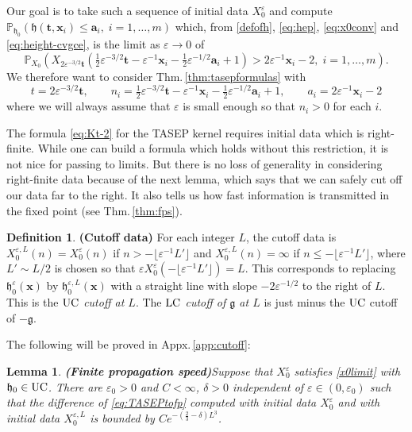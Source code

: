 \documentclass[letterpaper,reqno,11pt,oneside,final]{amsart}
\newtheorem{lem}[thm]{Lemma}
\theoremstyle{definition}
\newtheorem{defn}[thm]{Definition}
\newcommand{\fh}{\mathfrak{h}}
\newcommand{\fg}{\mathfrak{g}}
\newcommand{\xx}{X}
\newcommand{\pp}{\mathbb{P}}
\newcommand{\ep}{\varepsilon}
\newcommand{\uptext}[1]{\text{\upshape{#1}}}
\DeclareMathOperator{\UC}{\uptext{UC}}
\DeclareMathOperator{\LC}{\uptext{LC}}
\newcommand{\ft}{\mathbf{t}}
\newcommand{\fx}{\mathbf{x}}
\newcommand{\fa}{\mathbf{a}}
\numberwithin{equation}{section}
\begin{document}
Our goal is to take such a sequence of initial data $\xx^\ep_0$ and compute $\pp_{\fh_0} \!\left(\fh(\ft,\fx_i)\leq \fa_i,\;i=1,\dotsc,m\right)$ which, from \eqref{defofh}, \eqref{eq:hep}, \eqref{eq:x0conv} and \eqref{eq:height-cvgce}, is the limit as $\ep\to 0$ of
\begin{equation}\label{eq:TASEPtofp}
	\pp_{X_0}\!\left(X_{2\ep^{-3/2}\ft}(\tfrac12\ep^{-3/2}\ft-\ep^{-1}\fx_i-\tfrac12\ep^{-1/2}\fa_i+1)>2\ep^{-1}\fx_i-2,\;i=1,\dotsc,m\right).
\end{equation}
We therefore want to consider Thm.\,\ref{thm:tasepformulas} with 
\begin{equation}\label{eq:KPZscaling}
t=2\ep^{-3/2}\ft,\qquad  n_i = \tfrac{1}{2}\ep^{-3/2}\ft-\ep^{-1}\fx_i-\tfrac12\ep^{-1/2}\fa_i+1,\qquad a_i=2\ep^{-1}\fx_i-2
\end{equation}
where we will always assume that $\ep$ is small enough so that $n_i>0$ for each $i$.

The formula \eqref{eq:Kt-2} for the TASEP kernel requires initial data which is right-finite.
While one can build a formula which holds without this restriction, it is not nice for passing to limits.
But there is no loss of generality in considering right-finite data because of the next lemma, which says that we can safely cut off our data far to the right.  It also
tells us how fast information is transmitted in the fixed point (see Thm.\,\ref{thm:fps}). 

\begin{defn}\label{def:cutoff}{\bf (Cutoff data)}
\enspace For each integer $L$, the cutoff data is $X_0^{\ep,L}(n) = X^\ep_0(n)$ if 
$n  > -\lfloor\ep^{-1}L'\rfloor$  and $X_0^{\ep,L}(n) = \infty$ if $n\le -\lfloor\ep^{-1}L'\rfloor$, where $L'\sim L/2$ is chosen so that $\ep X^\ep_0(-\lfloor\ep^{-1}L'\rfloor)=L$.
This corresponds to replacing $\fh^{\ep}_0(\fx)$ by $\fh^{\ep,L}_0(\fx)$ with a straight line with slope $-2\ep^{-1/2}$ to the right of $L$.
This is the \emph{$\UC$ cutoff at $L$}.
The \emph{$\LC$ cutoff of $\fg$ at $L$} is just minus the $\UC$ cutoff of $-\fg$.
\end{defn}

The following will be proved in Appx.\,\ref{app:cutoff}:
  
\begin{lem}{\bf (Finite propagation speed)}\label{cutofflemma}
\enspace Suppose that $X^\ep_0$ satisfies \eqref{x0limit} with $\fh_0\in\UC$.
There are $\ep_0>0$ and $C<\infty$, $\delta>0$ independent of $\ep\in(0,\ep_0)$ such that the difference of \eqref{eq:TASEPtofp} computed with initial data $X^\ep_0$ and with initial data $X_0^{\ep,L}$ is bounded by $ C e^{-(\frac23 - \delta) L^3}$.
\end{lem}
\end{document}
